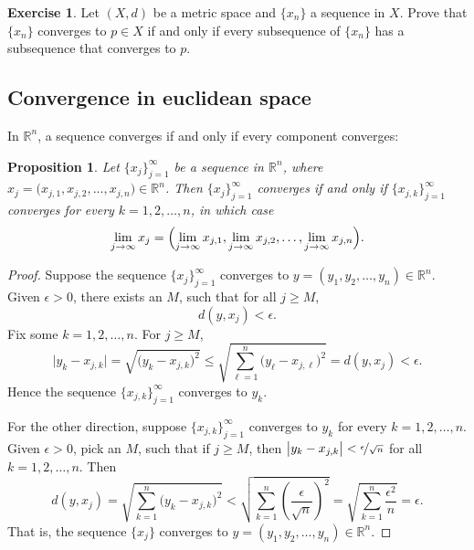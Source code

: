 \documentclass[12pt,openany]{book}
\newcommand{\R}{{\mathbb{R}}}
\theoremstyle{plain}
\newtheorem{prop}[thm]{Proposition}
\theoremstyle{remark}
\theoremstyle{definition}
\newenvironment{exbox}{%
    \def\FrameCommand{\vrule width 1pt \relax\hspace{10pt}}%
    \MakeFramed{\advance\hsize-\width\FrameRestore}%
}{%
    \endMakeFramed
}
\theoremstyle{exercise}
\newtheorem{exercise}{Exercise}[section]
\theoremstyle{example}
\begin{document}
\begin{exbox}
\begin{exercise}
Let $(X,d)$ be a metric space and $\{ x_n \}$ a sequence in $X$.
Prove that $\{ x_n \}$ converges to $p \in X$
if and only if
every subsequence of $\{ x_n \}$ has a subsequence that
converges to $p$.
\end{exercise}
\end{exbox}

\subsection{Convergence in euclidean space}

In $\R^n$, a sequence converges if and only if every
component converges:

\begin{prop} \label{prop:msconveuc}
Let $\{ x_j \}_{j=1}^\infty$ be a sequence in $\R^n$,
where $x_j = \bigl(x_{j,1},x_{j,2},\ldots,x_{j,n}\bigr) \in \R^n$.
Then $\{ x_j \}_{j=1}^\infty$ converges if and only if
$\{ x_{j,k} \}_{j=1}^\infty$ converges for every $k=1,2,\ldots,n$, in which case
\begin{equation*}
\lim_{j\to\infty}
x_j =
\Bigl(
\lim_{j\to\infty} x_{j,1},
\lim_{j\to\infty} x_{j,2},
\ldots,
\lim_{j\to\infty} x_{j,n}
\Bigr) .
\end{equation*}
\end{prop}

\begin{proof}
Suppose
the sequence
$\{ x_j \}_{j=1}^\infty$ converges to
$y = (y_1,y_2,\ldots,y_n) \in \R^n$.
Given $\epsilon > 0$, there exists an $M$, such that for all
$j \geq M$,
\begin{equation*}
d(y,x_j) < \epsilon.
\end{equation*}
Fix some $k=1,2,\ldots,n$.  For $j \geq M$,
\begin{equation*}
\bigl\lvert y_k - x_{j,k} \bigr\rvert
=
\sqrt{{\bigl(y_k - x_{j,k} \bigr)}^2}
\leq
\sqrt{\sum_{\ell=1}^n {\bigl(y_\ell-x_{j,\ell}\bigr)}^2}
= d(y,x_j) < \epsilon .
\end{equation*}
Hence the sequence $\{ x_{j,k} \}_{j=1}^\infty$ converges to $y_k$.

For the other direction, suppose 
$\{ x_{j,k} \}_{j=1}^\infty$ converges to $y_k$ for every $k=1,2,\ldots,n$.
Given $\epsilon > 0$, pick an $M$, such that if $j \geq M$, then 
$\bigl\lvert y_k-x_{j,k} \bigr\rvert < \nicefrac{\epsilon}{\sqrt{n}}$ for all
$k=1,2,\ldots,n$.  Then
\begin{equation*}
d(y,x_j)
=
\sqrt{\sum_{k=1}^n {\bigl(y_k-x_{j,k}\bigr)}^2}
<
\sqrt{\sum_{k=1}^n {\left(\frac{\epsilon}{\sqrt{n}}\right)}^2}
=
\sqrt{\sum_{k=1}^n \frac{{\epsilon^2}}{n}}
= \epsilon .
\end{equation*}
That is, the sequence $\{ x_j \}$ converges to
$y = (y_1,y_2,\ldots,y_n) \in \R^n$.
\end{proof}
\end{document}
